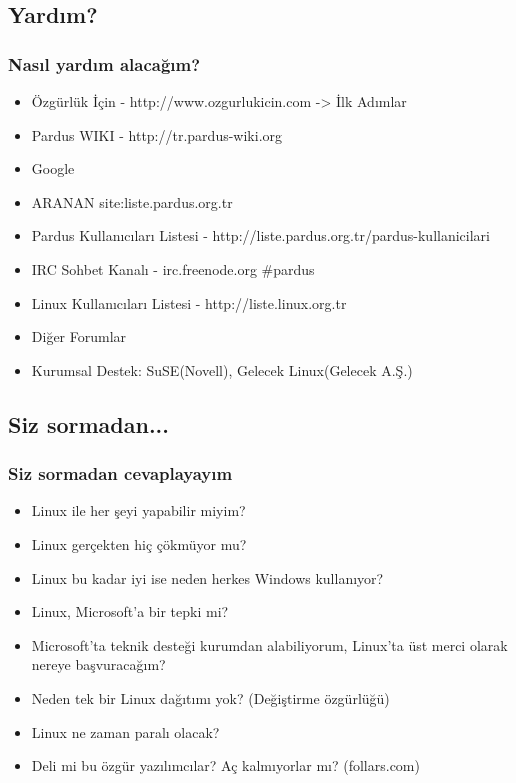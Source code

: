 \documentclass{beamer}
\begin{document}
	\subsection {Yardım?}
	\begin{frame}
		\frametitle{Nasıl yardım alacağım?}
		\begin{itemize}[<+->]
		 \item Özgürlük İçin - http://www.ozgurlukicin.com -> İlk Adımlar 
		 \item Pardus WIKI - http://tr.pardus-wiki.org 		 
		 \item \color{brown}Google
		 \item \color{brown}ARANAN site:liste.pardus.org.tr
		 \item Pardus Kullanıcıları Listesi - http://liste.pardus.org.tr/pardus-kullanicilari
		 \item IRC Sohbet Kanalı - irc.freenode.org \#pardus
		 \item \color{black}Linux Kullanıcıları Listesi - http://liste.linux.org.tr
		 \item Diğer Forumlar
		 \item Kurumsal Destek: SuSE(Novell), Gelecek Linux(Gelecek A.Ş.)
			 
		\end{itemize}

	\end{frame}
	
	\subsection{Siz sormadan...}
	\begin{frame}
	 	\frametitle{Siz sormadan cevaplayayım}
		\begin{itemize}[<+->]
			\item Linux ile her şeyi yapabilir miyim?
			\item Linux gerçekten hiç çökmüyor mu?
			\item Linux bu kadar iyi ise neden herkes Windows kullanıyor?
			\item Linux, Microsoft'a bir tepki mi?
			\item Microsoft'ta teknik desteği kurumdan alabiliyorum, Linux'ta üst merci olarak nereye başvuracağım?
			\item Neden tek bir Linux dağıtımı yok? (Değiştirme özgürlüğü)
			\item Linux ne zaman paralı olacak?
			\item Deli mi bu özgür yazılımcılar? Aç kalmıyorlar mı? (follars.com)
		\end{itemize}

	\end{frame}
	
\end{document}
